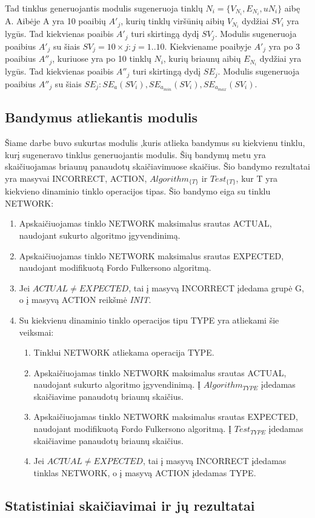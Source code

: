 Tad tinklus generuojantis modulis sugeneruoja tinklų $N_i = \{V_{N_i}, E_{N_i}, u{N_i}\}$ aibę A. Aibėje A yra 10 poaibių $A'_j$, kurių tinklų viršūnių aibių $V_{N_i}$ dydžiai $SV_i$ yra lygūs. Tad kiekvienas poaibis  $A'_j$ turi skirtingą dydį  $SV_j$. Modulis sugeneruoja poaibius $A'_j$ su šiais $SV_j = 10 \times j : j = 1 .. 10$. Kiekviename poaibyje $A'_j$ yra po 3 poaibius $A''_j$, kuriuose yra po 10 tinklų $N_i$, kurių briaunų aibių $E_{N_i}$ dydžiai yra lygūs. Tad kiekvienas poaibis  $A''_j$ turi skirtingą dydį  $SE_j$. Modulis sugeneruoja poaibius $A''_j$ su šiais  $SE_j : SE_{a}(SV_i), SE_{a_{min}}(SV_i) , SE_{a_{max}}(SV_i)$.

\subsection{Bandymus atliekantis modulis}

Šiame darbe buvo sukurtas modulis ,kuris atlieka bandymus su kiekvienu tinklu, kurį sugeneravo tinklus generuojantis modulis. Šių bandymų metu yra skaičiuojamas briaunų panaudotų skaičiavimuose skaičius. Šio bandymo rezultatai yra masyvai INCORRECT, ACTION, $Algorithm_{\{T\}}$ ir $Test_{\{T\}}$, kur T yra kiekvieno dinaminio tinklo operacijos tipas. Šio bandymo eiga su tinklu NETWORK:

\begin{enumerate}
	\item Apskaičiuojamas tinklo NETWORK maksimalus srautas ACTUAL, naudojant sukurto algoritmo įgyvendinimą.
	\item Apskaičiuojamas tinklo NETWORK maksimalus srautas EXPECTED, naudojant modifikuotą Fordo Fulkersono algoritmą.
	\item Jei $ACTUAL \neq EXPECTED$, tai į masyvą INCORRECT įdedama grupė G, o į masyvą ACTION reikšmė \textit{INIT}.
	\item Su kiekvienu dinaminio tinklo operacijos tipu TYPE yra atliekami šie veiksmai:
	\begin{enumerate}
		\item Tinklui NETWORK atliekama operacija TYPE.
		\item Apskaičiuojamas tinklo NETWORK maksimalus srautas ACTUAL, naudojant sukurto algoritmo įgyvendinimą. Į $Algorithm_{TYPE}$ įdedamas skaičiavime panaudotų briaunų skaičius.
		\item Apskaičiuojamas tinklo NETWORK maksimalus srautas EXPECTED, naudojant modifikuotą Fordo Fulkersono algoritmą. Į $Test_{TYPE}$ įdedamas skaičiavime panaudotų briaunų skaičius.
		\item Jei $ACTUAL \neq EXPECTED$, tai į masyvą INCORRECT įdedamas tinklas NETWORK, o į masyvą ACTION įdedamas TYPE.
	\end{enumerate}

\end{enumerate}

\subsection{Statistiniai skaičiavimai ir jų rezultatai}


